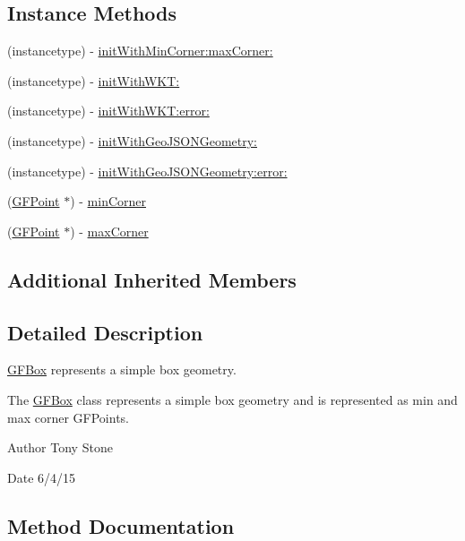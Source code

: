 \subsection*{Instance Methods}
\begin{DoxyCompactItemize}
\item 
(instancetype) -\/ \hyperlink{interface_g_f_box_a87bf50c9385711b4fed6c5ec9552397e}{init\+With\+Min\+Corner\+:max\+Corner\+:}
\item 
(instancetype) -\/ \hyperlink{interface_g_f_box_ab1c15e82e6b01e415e5fad629ac34ca4}{init\+With\+W\+K\+T\+:}
\item 
(instancetype) -\/ \hyperlink{interface_g_f_box_a063713c81e197900aca5ef8b3ed40448}{init\+With\+W\+K\+T\+:error\+:}
\item 
(instancetype) -\/ \hyperlink{interface_g_f_box_a4865745ca621d9ee91186301d1bee3b3}{init\+With\+Geo\+J\+S\+O\+N\+Geometry\+:}
\item 
(instancetype) -\/ \hyperlink{interface_g_f_box_ad7feeb72217dbd9a8d89336f15455cb7}{init\+With\+Geo\+J\+S\+O\+N\+Geometry\+:error\+:}
\item 
(\hyperlink{interface_g_f_point}{G\+F\+Point} $\ast$) -\/ \hyperlink{interface_g_f_box_a102f7c53d4871e5431e813a2cb43eccd}{min\+Corner}
\item 
(\hyperlink{interface_g_f_point}{G\+F\+Point} $\ast$) -\/ \hyperlink{interface_g_f_box_ac2926a7b4f4f826f769a6f59aecd6f64}{max\+Corner}
\end{DoxyCompactItemize}
\subsection*{Additional Inherited Members}


\subsection{Detailed Description}
\hyperlink{interface_g_f_box}{G\+F\+Box} represents a simple box geometry. 

The \hyperlink{interface_g_f_box}{G\+F\+Box} class represents a simple box geometry and is represented as min and max corner G\+F\+Points.

\begin{DoxyAuthor}{Author}
Tony Stone 
\end{DoxyAuthor}
\begin{DoxyDate}{Date}
6/4/15 
\end{DoxyDate}


\subsection{Method Documentation}
\hypertarget{interface_g_f_box_a87bf50c9385711b4fed6c5ec9552397e}{}

